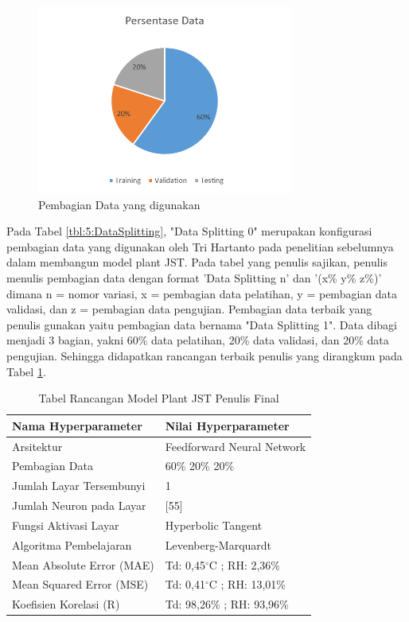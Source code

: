 \begin{figure}[!h]
	\centering
	\includegraphics[width=0.75\textwidth]{figures/DataSplittingFinal}
	\caption{Pembagian Data yang digunakan}
	\label{fig:5:DataSplittingFinal}
\end{figure}
\vspace{1em}

Pada Tabel \ref{tbl:5:DataSplitting}, "Data Splitting 0" merupakan konfigurasi pembagian data yang digunakan oleh Tri Hartanto pada penelitian sebelumnya dalam membangun model plant JST. Pada tabel yang penulis sajikan, penulis menulis pembagian data dengan format 'Data Splitting n' dan '(x\% y\% z\%)' dimana n = nomor variasi, x = pembagian data pelatihan, y = pembagian data validasi, dan z = pembagian data pengujian. Pembagian data terbaik yang penulis gunakan yaitu pembagian data bernama "Data Splitting 1". Data dibagi menjadi 3 bagian, yakni 60\% data pelatihan, 20\% data validasi, dan 20\% data pengujian. Sehingga didapatkan rancangan terbaik penulis yang dirangkum pada Tabel \ref{tbl:5:NNPlantRidhan}.\\

\begin{table}[!h]
	\caption{Tabel Rancangan Model Plant JST Penulis Final}
	\label{tbl:5:NNPlantRidhan}
	\centering
	\begin{tabular}{|p{5.7cm}|p{5cm}|}
		\hline
		\textbf{Nama Hyperparameter} & \textbf{Nilai Hyperparameter} \\ \hline
		Arsitektur & Feedforward Neural Network \\ \hline
		Pembagian Data & 60\% 20\% 20\% \\ \hline 
		Jumlah Layar Tersembunyi & 1 \\ \hline
		Jumlah Neuron pada Layar & [55] \\ \hline
		Fungsi Aktivasi Layar & Hyperbolic Tangent \\ \hline
		Algoritma Pembelajaran & Levenberg-Marquardt \\ \hline
		Mean Absolute Error (MAE) & Td: 0,45$^\circ$C ; RH: 2,36\% \\ \hline
		Mean Squared Error (MSE) & Td: 0,41$^\circ$C ; RH: 13,01\% \\ \hline
		Koefisien Korelasi (R) & Td: 98,26\% ; RH: 93,96\% \\ \hline
	\end{tabular}
\end{table}

